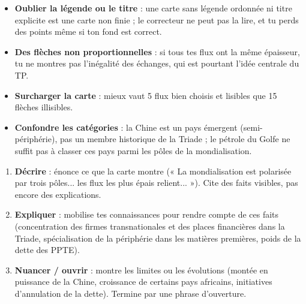 \documentclass[11pt]{article}
\begin{document}
\begin{attention}
\begin{itemize}
\item \textbf{Oublier la légende ou le titre} : une carte sans légende ordonnée ni titre explicite est une carte non finie ; le correcteur ne peut pas la lire, et tu perds des points même si ton fond est correct.
\item \textbf{Des flèches non proportionnelles} : si tous tes flux ont la même épaisseur, tu ne montres pas l'inégalité des échanges, qui est pourtant l'idée centrale du TP.
\item \textbf{Surcharger la carte} : mieux vaut 5 flux bien choisis et lisibles que 15 flèches illisibles.
\item \textbf{Confondre les catégories} : la Chine est un pays émergent (semi-périphérie), pas un membre historique de la Triade ; le pétrole du Golfe ne suffit pas à classer ces pays parmi les pôles de la mondialisation.
\end{itemize}
\end{attention}

\begin{methode}
\begin{enumerate}
\item \textbf{Décrire} : énonce ce que la carte montre (« La mondialisation est polarisée par trois pôles... les flux les plus épais relient... »). Cite des faits visibles, pas encore des explications.
\item \textbf{Expliquer} : mobilise tes connaissances pour rendre compte de ces faits (concentration des firmes transnationales et des places financières dans la Triade, spécialisation de la périphérie dans les matières premières, poids de la dette des PPTE).
\item \textbf{Nuancer / ouvrir} : montre les limites ou les évolutions (montée en puissance de la Chine, croissance de certains pays africains, initiatives d'annulation de la dette). Termine par une phrase d'ouverture.
\end{enumerate}
\end{methode}
\end{document}
